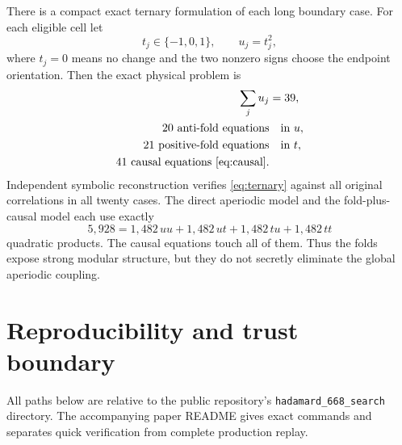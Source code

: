 \documentclass[11pt]{article}
\theoremstyle{remark}
\begin{document}
There is a compact exact ternary formulation of each long boundary case.
For each eligible cell let
\[
 t_j\in\{-1,0,1\},\qquad u_j=t_j^2,
\]
where $t_j=0$ means no change and the two nonzero signs choose the endpoint
orientation.  Then the exact physical problem is
\begin{equation}
\begin{aligned}
 \sum_j u_j&=39,\\
 20\ \text{anti-fold equations}&\quad\text{in }u,\\
 21\ \text{positive-fold equations}&\quad\text{in }t,\\
 41\ \text{causal equations \eqref{eq:causal}}.&
\end{aligned}                                        \label{eq:ternary}
\end{equation}
Independent symbolic reconstruction verifies \eqref{eq:ternary} against
all original correlations in all twenty cases.  The direct aperiodic model
and the fold-plus-causal model each use exactly
\[
 5{,}928
 =1{,}482\,uu+1{,}482\,ut+1{,}482\,tu+1{,}482\,tt
\]
quadratic products.  The causal equations touch all of them.  Thus the
folds expose strong modular structure, but they do not secretly eliminate
the global aperiodic coupling.

\section{Reproducibility and trust boundary}
\label{sec:repro}

All paths below are relative to the public repository's
\texttt{hadamard\_668\_search} directory.  The accompanying paper README
gives exact commands and separates quick verification from complete
production replay.
\end{document}
